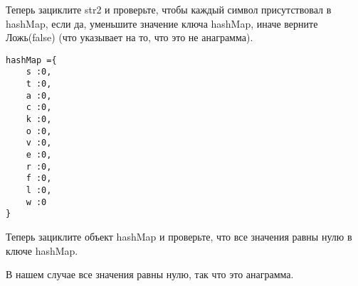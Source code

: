 Теперь зациклите str2 и проверьте, чтобы каждый символ присутствовал в
hashMap, если да, уменьшите значение ключа hashMap, иначе верните
Ложь(false) (что указывает на то, что это не анаграмма).
\vspace{\baselineskip}
\begin{tcolorbox}
\begin{verbatim}     
hashMap ={
    s :0,
    t :0, 
    a :0,  
    c :0,  
    k :0,  
    o :0,  
    v :0, 
    e :0,  
    r :0,   
    f :0,   
    l :0,  
    w :0
}
\end{verbatim}
\end{tcolorbox}
\vspace{\baselineskip}
Теперь зациклите объект hashMap и проверьте, что все значения равны нулю
в ключе hashMap.
\vspace{\baselineskip}

В нашем случае все значения равны нулю, так что это анаграмма.
